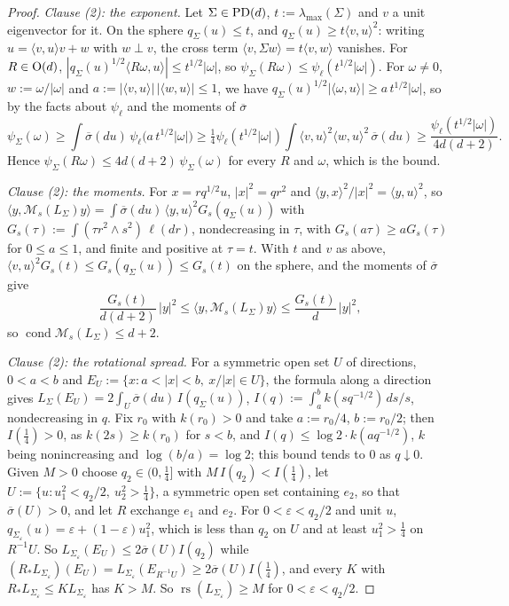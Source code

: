 \begin{proof}
\emph{Clause (2): the exponent.} Let $\Sigma \in \mathrm{PD}(d)$, $t := \lambda_{\max}(\Sigma)$ and $v$ a unit eigenvector for it. On
the sphere $q_\Sigma(u) \le t$, and $q_\Sigma(u) \ge t\langle v,u\rangle^2$: writing $u = \langle v,u\rangle v + w$ with
$w \perp v$, the cross term $\langle v,\Sigma w\rangle = t\langle v,w\rangle$ vanishes. For $R \in \mathrm{O}(d)$,
$|q_\Sigma(u)^{1/2}\langle R\omega,u\rangle| \le t^{1/2}|\omega|$, so $\psi_\Sigma(R\omega) \le \psi_\ell(t^{1/2}|\omega|)$. For
$\omega \ne 0$, $w := \omega/|\omega|$ and $a := |\langle v,u\rangle|\,|\langle w,u\rangle| \le 1$, we have
$q_\Sigma(u)^{1/2}|\langle\omega,u\rangle| \ge a\,t^{1/2}|\omega|$, so by the facts about $\psi_\ell$ and the moments of
$\overline\sigma$
\[
  \psi_\Sigma(\omega) \ge \int\overline\sigma(du)\,\psi_\ell\bigl(a\,t^{1/2}|\omega|\bigr)
  \ge \tfrac14\psi_\ell(t^{1/2}|\omega|)\int\langle v,u\rangle^2\langle w,u\rangle^2\,\overline\sigma(du)
  \ge \frac{\psi_\ell(t^{1/2}|\omega|)}{4d(d+2)} .
\]
Hence $\psi_\Sigma(R\omega) \le 4d(d+2)\,\psi_\Sigma(\omega)$ for every $R$ and $\omega$, which is the bound.

\emph{Clause (2): the moments.} For $x = rq^{1/2}u$, $|x|^2 = qr^2$ and $\langle y,x\rangle^2/|x|^2 = \langle y,u\rangle^2$, so
$\langle y,\mathcal M_s(L_\Sigma)y\rangle = \int\overline\sigma(du)\,\langle y,u\rangle^2G_s(q_\Sigma(u))$ with
$G_s(\tau) := \int(\tau r^2 \wedge s^2)\,\ell(dr)$, nondecreasing in $\tau$, with $G_s(a\tau) \ge aG_s(\tau)$ for
$0 \le a \le 1$, and finite and positive at $\tau = t$. With $t$ and $v$ as above,
$\langle v,u\rangle^2G_s(t) \le G_s(q_\Sigma(u)) \le G_s(t)$ on the sphere, and the moments of $\overline\sigma$ give
\[
  \frac{G_s(t)}{d(d+2)}\,|y|^2 \le \langle y,\mathcal M_s(L_\Sigma)y\rangle \le \frac{G_s(t)}{d}\,|y|^2 ,
\]
so $\operatorname{cond}\mathcal M_s(L_\Sigma) \le d+2$.

\emph{Clause (2): the rotational spread.} For a symmetric open set $U$ of directions, $0 < a < b$ and
$E_U := \{x : a < |x| < b,\ x/|x| \in U\}$, the formula along a direction gives
$L_\Sigma(E_U) = 2\int_U\overline\sigma(du)\,I(q_\Sigma(u))$, $I(q) := \int_a^bk(sq^{-1/2})\,ds/s$, nondecreasing in $q$. Fix $r_0$
with $k(r_0) > 0$ and take $a := r_0/4$, $b := r_0/2$; then $I(\tfrac14) > 0$, as $k(2s) \ge k(r_0)$ for $s < b$, and
$I(q) \le \log 2\cdot k(aq^{-1/2})$, $k$ being nonincreasing and $\log(b/a) = \log 2$; this bound tends to $0$ as
$q \downarrow 0$. Given $M > 0$ choose $q_2 \in (0,\tfrac14]$ with
$M\,I(q_2) < I(\tfrac14)$, let $U := \{u : u_1^2 < q_2/2,\ u_2^2 > \tfrac14\}$, a symmetric open set containing $e_2$, so that
$\overline\sigma(U) > 0$, and let $R$ exchange $e_1$ and $e_2$. For $0 < \varepsilon < q_2/2$ and unit $u$,
$q_{\Sigma_\varepsilon}(u) = \varepsilon + (1 - \varepsilon)u_1^2$, which is less than $q_2$ on $U$ and at least $u_1^2 > \tfrac14$ on
$R^{-1}U$. So $L_{\Sigma_\varepsilon}(E_U) \le 2\overline\sigma(U)I(q_2)$ while
$(R_*L_{\Sigma_\varepsilon})(E_U) = L_{\Sigma_\varepsilon}(E_{R^{-1}U}) \ge 2\overline\sigma(U)I(\tfrac14)$, and every $K$ with
$R_*L_{\Sigma_\varepsilon} \le KL_{\Sigma_\varepsilon}$ has $K > M$. So $\operatorname{rs}(L_{\Sigma_\varepsilon}) \ge M$ for
$0 < \varepsilon < q_2/2$.


\end{proof}
